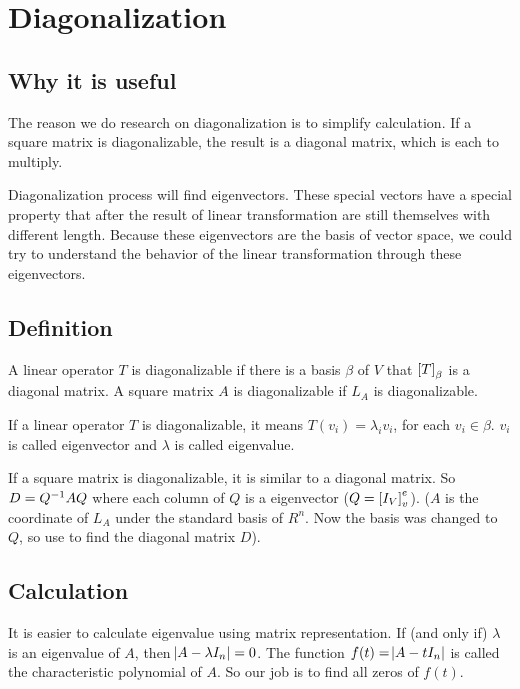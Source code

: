 \chapter{Diagonalization}

\section{Why it is useful}


The reason we do research on diagonalization is to simplify calculation. If a square matrix is diagonalizable, the result is a diagonal matrix, which is each to multiply.

Diagonalization process will find eigenvectors. These special vectors have a special property that after the result of linear transformation are still themselves with different length. Because these eigenvectors are the basis of vector space, we could try to understand the behavior of the linear transformation through these eigenvectors.

\section{Definition}


A linear operator $T$ is diagonalizable if there is a basis $\beta$ of $V$ that $\coordinate{T}_\beta$ is a diagonal matrix. A square matrix $A$ is diagonalizable if $L_A$ is diagonalizable.

If a linear operator $T$ is diagonalizable, it means $T(v_i) = \lambda_i v_i$, for each $v_i \in \beta$. $v_i$ is called eigenvector and $\lambda$ is called eigenvalue.

If a square matrix is diagonalizable, it is similar to a diagonal matrix. So $D = {Q}^{-1} A Q$ where each column of $Q$ is a eigenvector ($Q = \coordinate{I_V}_v^e$). ($A$ is the coordinate of $L_A$ under the standard basis of $R^n$. Now the basis was changed to $Q$, so use  to find the diagonal matrix $D$).



\section{Calculation}

It is easier to calculate eigenvalue using matrix representation. If (and only if) $\lambda$ is an eigenvalue of $A$, then $\abs{A - \lambda I_n} = 0$. The function $f(t) = \abs{A - t I_n}$ is called the characteristic polynomial of $A$. So our job is to find all zeros of $f(t)$.


